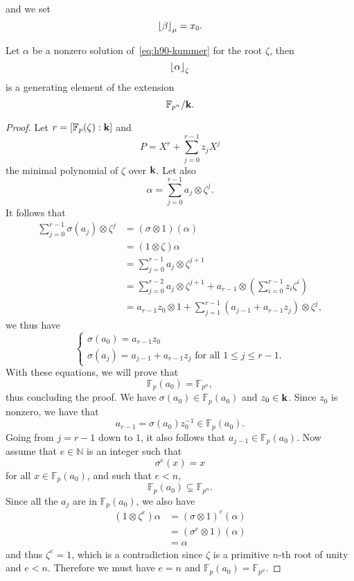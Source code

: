  and we set
 \[
   \left\lfloor \beta \right\rfloor_{\mu} = x_0.
 \]
 \begin{prop}
   \label{prop:generate}
   Let $\alpha$ be a nonzero solution of~\eqref{eq:h90-kummer} for the root
   $\zeta$, then
   \[
     \left\lfloor \alpha \right\rfloor_{\zeta}
   \]
   is a generating element of the extension
   \[
     \mathbb{F}_{p^n}/\mathbf{k}.
   \]
 \end{prop}
 \begin{proof}
   Let $r=\left[ \mathbb{F}_{p}(\zeta):\mathbf{k} \right]$ and
   \[
     P = X^r + \sum_{j=0}^{r-1}z_j X^j
   \]
   the minimal polynomial of $\zeta$ over $\mathbf{k}$. Let also
   \[
     \alpha = \sum_{j=0}^{r-1}a_j\otimes\zeta^j.
   \]
   It follows that 
   \begin{align*}
     \sum_{j=0}^{r-1}\sigma(a_j)\otimes\zeta^j &=(\sigma\otimes1)(\alpha)\\
     &= (1\otimes\zeta)\alpha\\
     &= \sum_{j=0}^{r-1}a_j\otimes\zeta^{j+1}\\
     &= \sum_{j=0}^{r-2}a_j\otimes\zeta^{j+1} +
     a_{r-1}\otimes(\sum_{i=0}^{r-1}z_i\zeta^i)\\
     &= a_{r-1}z_0\otimes 1 +
     \sum_{j=1}^{r-1}(a_{j-1}+a_{r-1}z_j)\otimes\zeta^j,
   \end{align*}
   we thus have
   \[
   \left\{ 
     \begin{array}{l}
       \sigma(a_0) = a_{r-1}z_0 \\
       \sigma(a_j) = a_{j-1}+a_{r-1}z_j\text{ for all }1\leq j\leq r-1.
     \end{array}
   \right.
 \]
 With these equations, we will prove that
 \[
   \mathbb{F}_p(a_0) = \mathbb{F}_{p^n},
 \]
 thus concluding the proof. We have $\sigma(a_0)\in\mathbb{F}_p(a_0)$ and
 $z_0\in\mathbf{k}$. Since $z_0$ is nonzero, we have that
 \[
   a_{r-1} = \sigma(a_0)z_0^{-1}\in\mathbb{F}_p(a_0).
 \]
 Going from $j=r-1$ down to $1$, it also follows that
 $a_{j-1}\in\mathbb{F}_{p}(a_0)$. Now assume that $e\in\mathbb{N}$ is an integer
 such that
 \[
   \sigma^e(x) = x
 \]
 for all $x\in\mathbb{F}_p(a_0)$, and such that $e<n$, \ie
 \[
   \mathbb{F}_p(a_0)\subsetneq \mathbb{F}_{p^n}.
 \]
 Since all the $a_j$ are in $\mathbb{F}_{p}(a_0)$, we also have
 \begin{align*}
  (1\otimes\zeta^e)\alpha &= (\sigma\otimes1)^e(\alpha)\\
  &= (\sigma^e\otimes1)(\alpha)\\
  &= \alpha
 \end{align*}
 and thus $\zeta^e=1$, which is a contradiction since $\zeta$ is a primitive
 $n$-th root of unity and $e<n$. Therefore we must have $e=n$ and
 $\mathbb{F}_p(a_0) = \mathbb{F}_{p^n}$.
 \end{proof}
